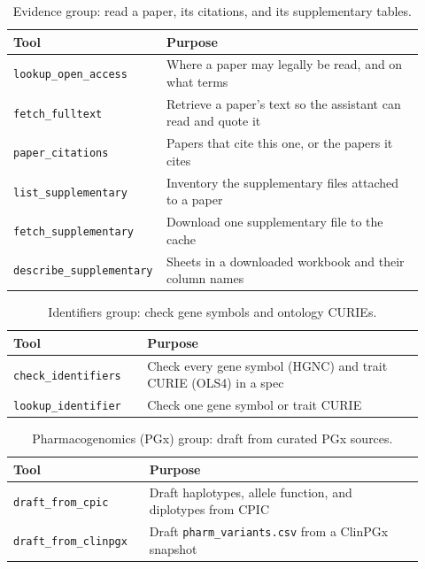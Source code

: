 \documentclass[11pt,a4paper]{article}
\begin{document}
\begin{table}[ht]
\centering
\scriptsize
\caption{Evidence group: read a paper, its citations, and its supplementary tables.}
\label{tab:tools-evidence}
\begin{tabular}{@{}p{0.30\linewidth}p{0.62\linewidth}@{}}
\toprule
Tool & Purpose \\
\midrule
\texttt{lookup\_open\_access}     & Where a paper may legally be read, and on what terms \\
\texttt{fetch\_fulltext}          & Retrieve a paper's text so the assistant can read and quote it \\
\texttt{paper\_citations}         & Papers that cite this one, or the papers it cites \\
\texttt{list\_supplementary}      & Inventory the supplementary files attached to a paper \\
\texttt{fetch\_supplementary}     & Download one supplementary file to the cache \\
\texttt{describe\_supplementary}  & Sheets in a downloaded workbook and their column names \\
\bottomrule
\end{tabular}
\end{table}

\begin{table}[ht]
\centering
\scriptsize
\caption{Identifiers group: check gene symbols and ontology CURIEs.}
\label{tab:tools-identifiers}
\begin{tabular}{@{}p{0.30\linewidth}p{0.62\linewidth}@{}}
\toprule
Tool & Purpose \\
\midrule
\texttt{check\_identifiers}  & Check every gene symbol (HGNC) and trait CURIE (OLS4) in a spec \\
\texttt{lookup\_identifier}  & Check one gene symbol or trait CURIE \\
\bottomrule
\end{tabular}
\end{table}

\begin{table}[ht]
\centering
\scriptsize
\caption{Pharmacogenomics (PGx) group: draft from curated PGx sources.}
\label{tab:tools-pgx}
\begin{tabular}{@{}p{0.30\linewidth}p{0.62\linewidth}@{}}
\toprule
Tool & Purpose \\
\midrule
\texttt{draft\_from\_cpic}     & Draft haplotypes, allele function, and diplotypes from CPIC \\
\texttt{draft\_from\_clinpgx}  & Draft \texttt{pharm\_variants.csv} from a ClinPGx snapshot \\
\bottomrule
\end{tabular}
\end{table}
\end{document}
